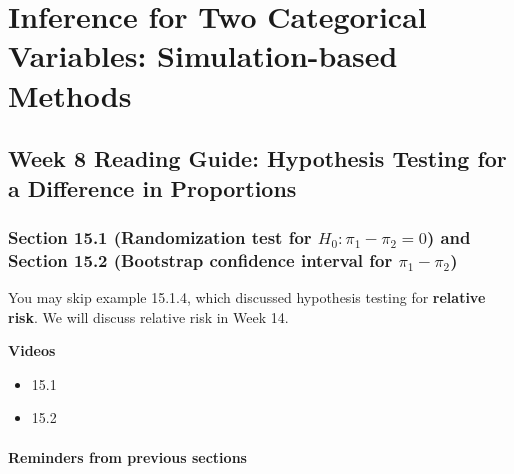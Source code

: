 \documentclass[
]{report}
\providecommand{\tightlist}{%
  \setlength{\itemsep}{0pt}\setlength{\parskip}{0pt}}
\begin{document}
\newpage

\hypertarget{inference-for-two-categorical-variables-simulation-based-methods}{%
\chapter{Inference for Two Categorical Variables: Simulation-based Methods}\label{inference-for-two-categorical-variables-simulation-based-methods}}

\hypertarget{week-8-reading-guide-hypothesis-testing-for-a-difference-in-proportions}{%
\section{Week 8 Reading Guide: Hypothesis Testing for a Difference in Proportions}\label{week-8-reading-guide-hypothesis-testing-for-a-difference-in-proportions}}

\hypertarget{section-15.1-randomization-test-for-h_0-pi_1---pi_2-0-and-section-15.2-bootstrap-confidence-interval-for-pi_1---pi_2}{%
\subsection*{\texorpdfstring{Section 15.1 (Randomization test for \(H_0: \pi_1 - \pi_2 = 0\)) and Section 15.2 (Bootstrap confidence interval for \(\pi_1 - \pi_2\))}{Section 15.1 (Randomization test for H\_0: \textbackslash pi\_1 - \textbackslash pi\_2 = 0) and Section 15.2 (Bootstrap confidence interval for \textbackslash pi\_1 - \textbackslash pi\_2)}}\label{section-15.1-randomization-test-for-h_0-pi_1---pi_2-0-and-section-15.2-bootstrap-confidence-interval-for-pi_1---pi_2}}

You may skip example 15.1.4, which discussed hypothesis testing for \textbf{relative risk}. We will discuss relative risk in Week 14.

\textbf{Videos}

\begin{itemize}
\tightlist
\item
  15.1
\item
  15.2
\end{itemize}


\hypertarget{reminders-from-previous-sections-7}{%
\subsubsection*{Reminders from previous sections}\label{reminders-from-previous-sections-7}}
\end{document}
